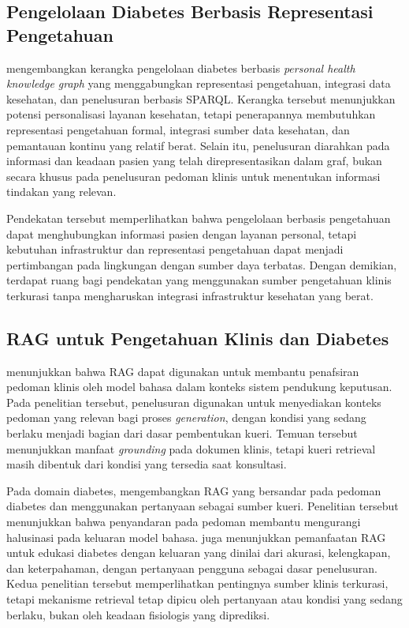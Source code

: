 \subsection{Pengelolaan Diabetes Berbasis Representasi Pengetahuan}
\label{subsec:bab2-penelitian-knowledge-representation}

\textcite{rad2024} mengembangkan kerangka pengelolaan diabetes berbasis \textit{personal health knowledge graph} yang menggabungkan representasi pengetahuan, integrasi data
kesehatan, dan penelusuran berbasis SPARQL. Kerangka tersebut menunjukkan potensi personalisasi layanan kesehatan, tetapi penerapannya membutuhkan representasi pengetahuan
formal, integrasi sumber data kesehatan, dan pemantauan kontinu yang relatif berat. Selain itu, penelusuran diarahkan pada informasi dan keadaan
pasien yang telah direpresentasikan dalam graf, bukan secara khusus pada penelusuran pedoman klinis untuk menentukan informasi tindakan yang relevan.

Pendekatan tersebut memperlihatkan bahwa pengelolaan berbasis pengetahuan dapat menghubungkan informasi pasien dengan layanan personal, tetapi kebutuhan infrastruktur dan
representasi pengetahuan dapat menjadi pertimbangan pada lingkungan dengan sumber daya terbatas. Dengan demikian, terdapat ruang bagi pendekatan yang menggunakan sumber
pengetahuan klinis terkurasi tanpa mengharuskan integrasi infrastruktur kesehatan yang berat.

\subsection{RAG untuk Pengetahuan Klinis dan Diabetes}
\label{subsec:bab2-penelitian-rag-klinis}

\textcite{kresevic2024} menunjukkan bahwa RAG dapat digunakan untuk membantu penafsiran pedoman klinis oleh model bahasa dalam konteks sistem pendukung keputusan. Pada penelitian
tersebut, penelusuran digunakan untuk menyediakan konteks pedoman yang relevan bagi proses \textit{generation}, dengan kondisi yang sedang berlaku menjadi bagian dari dasar
pembentukan kueri. Temuan tersebut menunjukkan manfaat \textit{grounding} pada dokumen klinis, tetapi kueri retrieval masih dibentuk dari kondisi yang tersedia saat konsultasi.

Pada domain diabetes, \textcite{lee2024} mengembangkan RAG yang bersandar pada pedoman diabetes dan menggunakan pertanyaan sebagai sumber kueri. Penelitian tersebut
menunjukkan bahwa penyandaran pada pedoman membantu mengurangi halusinasi pada keluaran model bahasa. \textcite{wang2024} juga menunjukkan pemanfaatan RAG untuk
edukasi diabetes dengan keluaran yang dinilai dari akurasi, kelengkapan, dan keterpahaman, dengan pertanyaan pengguna sebagai dasar penelusuran. Kedua
penelitian tersebut memperlihatkan pentingnya sumber klinis terkurasi, tetapi mekanisme retrieval tetap dipicu oleh pertanyaan atau kondisi yang sedang berlaku, bukan oleh
keadaan fisiologis yang diprediksi.


